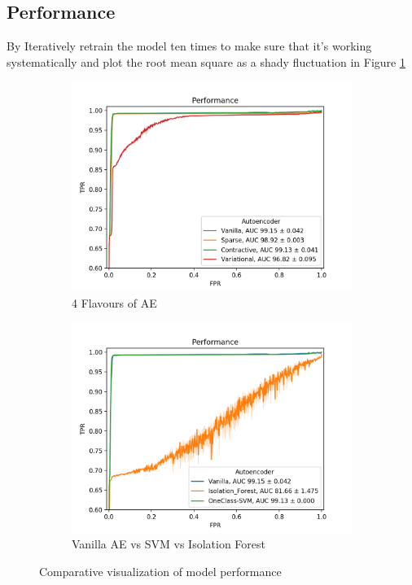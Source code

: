 \subsection{Performance}
By Iteratively retrain the model ten times to make sure that it's working systematically and plot the root mean square as a shady fluctuation in Figure \ref{fig:performance_2016}
\begin{figure}[h!]
\centering
    \begin{subfigure}[b]{0.49\linewidth}
        \includegraphics[width=\linewidth]{images/reco/2016/performance.png}
        \caption{4 Flavours of AE}
    \end{subfigure}
    \begin{subfigure}[b]{0.49\linewidth}
        \includegraphics[width=\linewidth]{images/reco/2016/performance_ml.png}
        \caption{Vanilla AE vs SVM vs Isolation Forest}
    \end{subfigure}
\caption{Comparative visualization of model performance}
\label{fig:performance_2016}
\end{figure}

